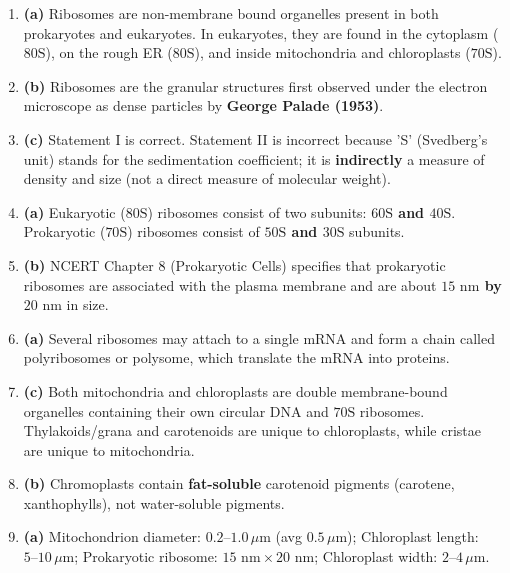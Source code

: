 \documentclass[11pt, a4paper]{article}
\begin{document}
\begin{enumerate}[label=\textbf{\arabic*.}, leftmargin=*, itemsep=6pt]
    \item \textbf{(a)} Ribosomes are non-membrane bound organelles present in both prokaryotes and eukaryotes. In eukaryotes, they are found in the cytoplasm ($80\text{S}$), on the rough ER ($80\text{S}$), and inside mitochondria and chloroplasts ($70\text{S}$).

    \item \textbf{(b)} Ribosomes are the granular structures first observed under the electron microscope as dense particles by \textbf{George Palade (1953)}.

    \item \textbf{(c)} Statement I is correct. Statement II is incorrect because 'S' (Svedberg's unit) stands for the sedimentation coefficient; it is \textbf{indirectly} a measure of density and size (not a direct measure of molecular weight).

    \item \textbf{(a)} Eukaryotic ($80\text{S}$) ribosomes consist of two subunits: \textbf{$60\text{S}$ and $40\text{S}$}. Prokaryotic ($70\text{S}$) ribosomes consist of \textbf{$50\text{S}$ and $30\text{S}$} subunits.

    \item \textbf{(b)} NCERT Chapter 8 (Prokaryotic Cells) specifies that prokaryotic ribosomes are associated with the plasma membrane and are about \textbf{$15\text{ nm}$ by $20\text{ nm}$} in size.

    \item \textbf{(a)} Several ribosomes may attach to a single mRNA and form a chain called polyribosomes or polysome, which translate the mRNA into proteins.

    \item \textbf{(c)} Both mitochondria and chloroplasts are double membrane-bound organelles containing their own circular DNA and $70\text{S}$ ribosomes. Thylakoids/grana and carotenoids are unique to chloroplasts, while cristae are unique to mitochondria.

    \item \textbf{(b)} Chromoplasts contain \textbf{fat-soluble} carotenoid pigments (carotene, xanthophylls), not water-soluble pigments.

    \item \textbf{(a)} Mitochondrion diameter: $0.2\text{--}1.0\,\mu\text{m}$ (avg $0.5\,\mu\text{m}$); Chloroplast length: $5\text{--}10\,\mu\text{m}$; Prokaryotic ribosome: $15\text{ nm} \times 20\text{ nm}$; Chloroplast width: $2\text{--}4\,\mu\text{m}$.


\end{enumerate}
\end{document}
